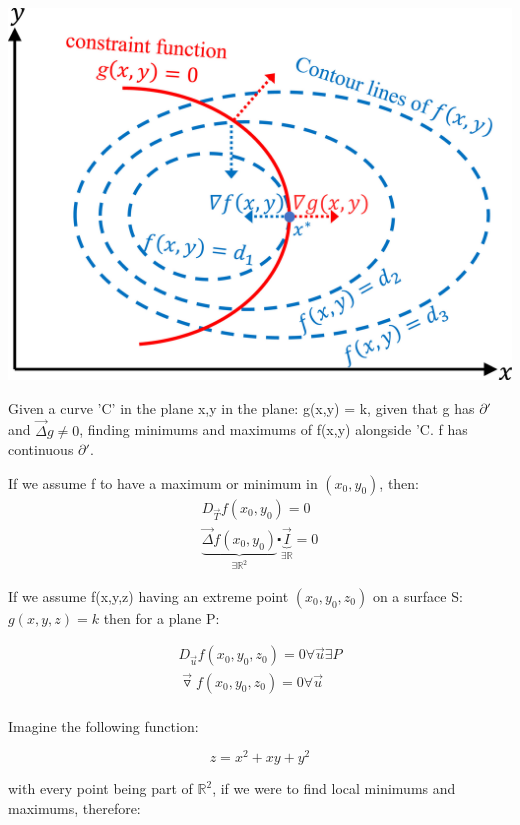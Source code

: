\documentclass[11pt,fleqn]{book} %
\begin{document}
\begin{center}
    \includegraphics*[]{Pictures/lagrange.jpg}
\end{center}

Given a curve 'C' in the plane x,y in the plane: g(x,y) = k,
given that g has $\partial '$ and $\vec{\Delta} g \neq 0$,
finding minimums and maximums of f(x,y) alongside 'C.
f has continuous $\partial '$. 

If we assume f to have a maximum or minimum in $(x_0, y_0)$, then:
\begin{gather}
    D_{\vec{T}}f(x_0,y_0) = 0 \\
    \underbrace{\vec{\Delta}f(x_0,y_0)}_{\exists \mathbb{R}^2} \centerdot \underbrace{\vec{I}}_{\exists \mathbb{R}} = 0
\end{gather}

If we assume f(x,y,z) having an extreme point $(x_0,y_0,z_0)$ on a surface S:
$g(x,y,z) = k$ then for a plane P:

\begin{gather}
    D_{\vec{u}}f(x_0,y_0,z_0) = 0 \forall \vec{u} \exists P \\
    \vec{\triangledown} f(x_0,y_0,z_0) = 0 \forall \vec{u}\\
\end{gather}

Imagine the following function:

$$ z =  x^2 + xy + y^2 $$

with every point being part of $\mathbb{R}^2$, if we were to find local minimums and maximums,
therefore:
\end{document}
